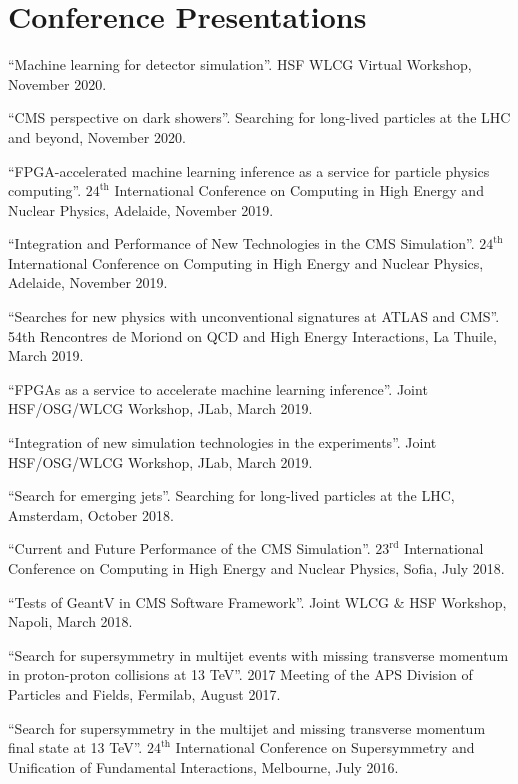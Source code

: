 \section{Conference Presentations}
\begin{description}[leftmargin=12pt,font=\normalfont,labelsep=0em]
\item ``Machine learning for detector simulation''. HSF WLCG Virtual Workshop, November 2020.
\item ``CMS perspective on dark showers''. Searching for long-lived particles at the LHC and beyond, November 2020.
\item ``FPGA-accelerated machine learning inference as a service for particle physics computing''. $24^{\text{th}}$ International Conference on Computing in High Energy and Nuclear Physics, Adelaide, November 2019.
\item ``Integration and Performance of New Technologies in the CMS Simulation''. $24^{\text{th}}$ International Conference on Computing in High Energy and Nuclear Physics, Adelaide, November 2019.
\item ``Searches for new physics with unconventional signatures at ATLAS and CMS''. 54th Rencontres de Moriond on QCD and High Energy Interactions, La Thuile, March 2019.
\item ``FPGAs as a service to accelerate machine learning inference''. Joint HSF/OSG/WLCG Workshop, JLab, March 2019.
\item ``Integration of new simulation technologies in the experiments''. Joint HSF/OSG/WLCG Workshop, JLab, March 2019.
\item ``Search for emerging jets''. Searching for long-lived particles at the LHC, Amsterdam, October 2018.
\item ``Current and Future Performance of the CMS Simulation''. $23^{\text{rd}}$ International Conference on Computing in High Energy and Nuclear Physics, Sofia, July 2018.
\item ``Tests of GeantV in CMS Software Framework''. Joint WLCG \& HSF Workshop, Napoli, March 2018.
\item ``Search for supersymmetry in multijet events with missing transverse momentum in proton-proton collisions at 13 TeV''. 2017 Meeting of the APS Division of Particles and Fields, Fermilab, August 2017.
\item ``Search for supersymmetry in the multijet and missing transverse momentum final state at 13 TeV''. $24^{\text{th}}$ International Conference on Supersymmetry and Unification of Fundamental Interactions, Melbourne, July 2016.

\end{description}
